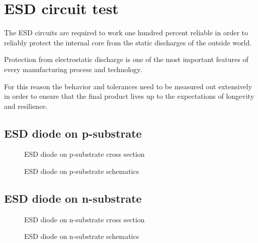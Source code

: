 \section{ESD circuit test}
The ESD circuits are required to work one hundred percent reliable in order to reliably protect the internal core from the static discharges of the outside world.

Protection from electrostatic discharge is one of the most important features of every manufacturing process and technology.

For this reason the behavior and tolerances need to be measured out extensively in order to ensure that the final product lives up to the expectations of longevity and resilience.

\subsection{ESD diode on p-substrate}
\begin{figure}[H]
	\centering
	\begin{tikzpicture}[node distance = 3cm, auto, thick,scale=0.5, every node/.style={transform shape}]
		
	\end{tikzpicture}
	\caption{ESD diode on p-substrate cross section}
	\label{p_sub_ESD_cross}
\end{figure}

\begin{figure}[H]
	\centering
	\begin{tikzpicture}[node distance = 3cm, auto, thick,scale=0.5, every node/.style={transform shape}]
		
	\end{tikzpicture}
	\caption{ESD diode on p-substrate schematics}
	\label{p_sub_ESD_schematic}
\end{figure}

\subsection{ESD diode on n-substrate}
\begin{figure}[H]
	\centering
	\begin{tikzpicture}[node distance = 3cm, auto, thick,scale=0.5, every node/.style={transform shape}]
		
	\end{tikzpicture}
	\caption{ESD diode on n-substrate cross section}
	\label{n_sub_ESD_cross}
\end{figure}

\begin{figure}[H]
	\centering
	\begin{tikzpicture}[node distance = 3cm, auto, thick,scale=0.5, every node/.style={transform shape}]
		
	\end{tikzpicture}
	\caption{ESD diode on n-substrate schematics}
	\label{n_sub_ESD_schematic}
\end{figure}